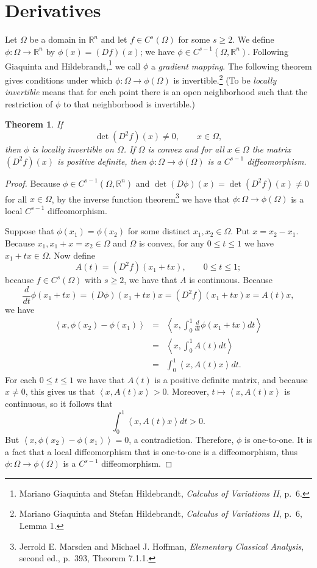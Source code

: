 \documentclass{article}
\newcommand{\inner}[2]{\left\langle #1, #2 \right\rangle}
\newtheorem{theorem}{Theorem}
\theoremstyle{definition}
\begin{document}
\section{Derivatives}
Let $\Omega$ be a domain in $\mathbb{R}^n$ and let $f \in C^s(\Omega)$ for some $s \geq 2$. 
We define $\phi:\Omega \to \mathbb{R}^n$ by $\phi(x)=(D f)(x)$; we have $\phi \in C^{s-1}(\Omega,\mathbb{R}^n)$.
Following Giaquinta and Hildebrandt,\footnote{Mariano
Giaquinta and Stefan Hildebrandt, {\em Calculus of Variations II}, p.~6.} we call $\phi$ a {\em gradient mapping}. The following theorem gives conditions under which $\phi:\Omega \to \phi(\Omega)$ is 
  invertible.\footnote{Mariano
Giaquinta and Stefan Hildebrandt, {\em Calculus of Variations II}, p.~6, Lemma 1.} (To be {\em locally invertible}
means that for each point there is an open neighborhood such that the restriction of $\phi$ to that neighborhood is invertible.)

\begin{theorem}
If 
\[
\det (D^2 f)(x) \neq 0, \qquad x \in \Omega,
\]
then $\phi$ is locally invertible on $\Omega$. If $\Omega$ is convex and for all $x \in \Omega$ the matrix $(D^2 f)(x)$ is positive definite,
then $\phi:\Omega \to \phi(\Omega)$ is a $C^{s-1}$ diffeomorphism.
\end{theorem}
\begin{proof}
Because $\phi \in C^{s-1}(\Omega,\mathbb{R}^n)$ and $\det (D\phi)(x) = \det (D^2 f)(x) \neq 0$ for all $x \in \Omega$, by the inverse function theorem\footnote{Jerrold E.
Marsden and Michael J. Hoffman, {\em Elementary Classical Analysis}, second ed., p.~393, Theorem 7.1.1.} we have that
$\phi:\Omega \to \phi(\Omega)$ is a local $C^{s-1}$ diffeomorphism. 

Suppose that $\phi(x_1)=\phi(x_2)$ for some distinct $x_1,x_2 \in \Omega$. Put $x=x_2-x_1$.
Because $x_1,x_1+x=x_2 \in \Omega$ and $\Omega$ is convex, for any $0 \leq t \leq 1$ we have $x_1+tx \in \Omega$. Now define
\[
A(t) = (D^2 f) (x_1+tx),\qquad 0 \leq t \leq 1;
\]
because $f\in C^s(\Omega)$ with $s \geq 2$, we have that $A$ is continuous. Because
\[
\frac{d}{dt}\phi(x_1+tx) = (D\phi) (x_1+tx)x =(D^2 f)(x_1+tx)x= A(t)x,
\]
 we have
\begin{eqnarray*}
\inner{x}{\phi(x_2)-\phi(x_1)}&=&\inner{x}{\int_0^1 \frac{d}{dt}\phi(x_1+tx) dt}\\
&=&\inner{x}{\int_0^1 A(t) dt}\\
&=&\int_0^1 \inner{x}{A(t)x} dt.
\end{eqnarray*}
For each $0 \leq t \leq 1$ we have that $A(t)$ is a positive definite matrix, and because $x \neq 0$, this gives us that
$\inner{x}{A(t)x} > 0$. Moreover, $t \mapsto \inner{x}{A(t)x}$ is continuous, so it follows that
\[
\int_0^1 \inner{x}{A(t)x} dt > 0.
\]
But $\inner{x}{\phi(x_2)-\phi(x_1)}=0$, a contradiction. Therefore, $\phi$ is one-to-one.
It is a fact that a local diffeomorphism that is one-to-one is a diffeomorphism, thus $\phi:\Omega \to \phi(\Omega)$ is a $C^{s-1}$
diffeomorphism.
\end{proof}
\end{document}
